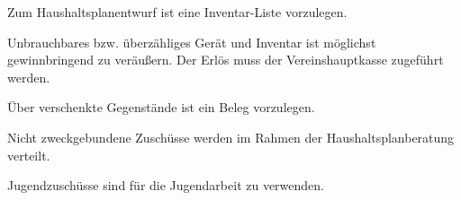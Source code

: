\begin{finanz}
  Zum Haushaltsplanentwurf ist eine Inventar-Liste vorzulegen.

  Unbrauchbares bzw. überzähliges Gerät und Inventar ist möglichst gewinnbringend zu veräußern. Der Erlös muss der Vereinshauptkasse zugeführt werden.

  Über verschenkte Gegenstände ist ein Beleg vorzulegen.


  Nicht zweckgebundene Zuschüsse werden im Rahmen der Haushaltsplanberatung verteilt.

  Jugendzuschüsse sind für die Jugendarbeit zu verwenden.

\end{finanz}



